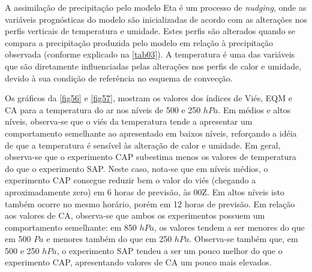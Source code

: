 A assimilação de precipitação pelo modelo Eta é um processo de \textit{nudging}, onde as variáveis prognósticas do modelo são inicializadas de acordo com as alterações nos perfis verticais de temperatura e umidade. Estes perfis são alterados quando se compara a precipitação produzida pelo modelo em relação à precipitação observada (conforme explicado na \autoref{tab03}). A temperatura é uma das variáveis que são diretamente influenciadas pelas alterações nos perfis de calor e umidade, devido à sua condição de referência no esquema de convecção. 

Os gráficos da \autoref{fig56} e \autoref{fig57}, mostram os valores dos índices de Viés, EQM e CA para a temperatura do ar nos níveis de 500 e 250 $hPa$. Em médios e altos níveis, observa-se que o viés da temperatura tende a apresentar um comportamento semelhante ao apresentado em baixos níveis, reforçando a idéia de que a temperatura é sensível às alteração de calor e umidade. Em geral, observa-se que o experimento CAP subestima menos os valores de temperatura do que o experimento SAP. Neste caso, nota-se que em níveis médios, o experimento CAP consegue reduzir bem o valor do viés (chegando a aproximadamente zero) em 6 horas de previsão, às 00Z. Em altos níveis isto também ocorre no mesmo horário, porém em 12 horas de previsão. Em relação aos valores de CA, observa-se que ambos os experimentos possuem um comportamento semelhante: em 850 $hPa$, os valores tendem a ser menores do que em 500 $Pa$ e menores também do que em 250 $hPa$. Observa-se também que, em 500 e 250 $hPa$, o experimento SAP tendeu a ser um pouco melhor do que o experimento CAP, apresentando valores de CA um pouco mais elevados.

